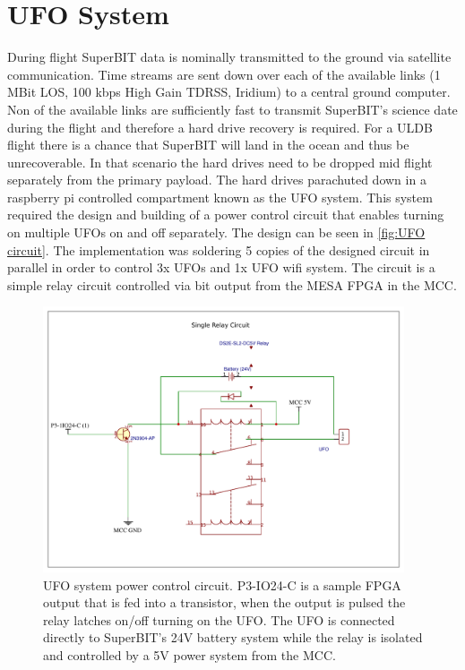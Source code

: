 \section{UFO System}
During flight SuperBIT data is nominally transmitted to the ground via satellite communication. Time streams are sent down over each of the
available links (1 MBit LOS, 100 kbps High Gain TDRSS, Iridium) to a central ground computer. Non of the available links are sufficiently fast to transmit SuperBIT's science date during the flight and therefore a hard drive recovery is required.
For a ULDB flight there is a chance that SuperBIT will land in the ocean and thus be unrecoverable. In that scenario the hard drives need to be dropped mid flight separately from the primary payload. The hard drives parachuted down in a raspberry pi controlled compartment known as the UFO system. This system required the design and building of a power control circuit that enables turning on multiple UFOs on and off separately. The design can be seen in \autoref{fig:UFO circuit}. The implementation was soldering 5 copies of the designed circuit in parallel in order to control 3x UFOs and 1x UFO wifi system. The circuit is a simple relay circuit controlled via bit output from the MESA FPGA in the MCC. 

\begin{figure}
    \begin{small}
        \begin{center}
            \includegraphics[width=0.95\textwidth]{Hardware/figs/UFO_circ.pdf}
        \end{center}
        \caption{UFO system power control circuit. P3-IO24-C is a sample FPGA output that is fed into a transistor, when the output is pulsed the relay latches on/off turning on the UFO. The UFO is connected directly to SuperBIT's 24V battery system while the relay is isolated and controlled by a 5V power system from the MCC.}
        \label{fig:UFO circuit}
    \end{small}
\end{figure}




